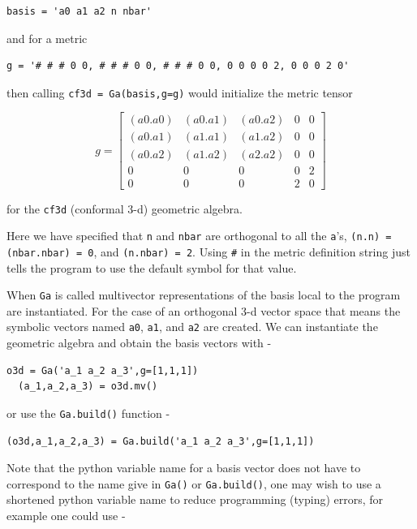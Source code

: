 \documentclass[12pt]{report}
\newcommand{\lbrk}{\left [}
\newcommand{\rbrk}{\right ]}
\newcommand{\T}[1]{\texttt{#1}}
\begin{document}
\begin{lstlisting}[numbers=none]
  basis = 'a0 a1 a2 n nbar'
\end{lstlisting}

and for a metric

\begin{lstlisting}[numbers=none]
  g = '# # # 0 0, # # # 0 0, # # # 0 0, 0 0 0 0 2, 0 0 0 2 0'
\end{lstlisting}

then calling \T{cf3d = Ga(basis,g=g)} would initialize the metric tensor

  \begin{equation}
  g = \lbrk
  \begin{array}{ccccc}
    (a0.a0) & (a0.a1)  & (a0.a2) & 0 & 0\\
    (a0.a1) & (a1.a1)  & (a1.a2) & 0 & 0\\
    (a0.a2) & (a1.a2)  & (a2.a2) & 0 & 0 \\
    0 & 0 & 0 & 0 & 2 \\
    0 & 0 & 0 & 2 & 0
  \end{array}
  \rbrk
  \end{equation}

for the  \T{cf3d} (conformal 3-d) geometric algebra.

Here we have specified that \T{n} and \T{nbar} are orthogonal to all the
\T{a}'s, \T{(n.n) = (nbar.nbar) = 0}, and \T{(n.nbar) = 2}. Using
\T{\#} in the metric definition string just tells the program to use the
default symbol for that value.

When \T{Ga} is called multivector representations of the basis local to
the program are instantiated.  For the case of an orthogonal 3-d vector
space that means the
symbolic vectors named \T{a0}, \T{a1}, and \T{a2} are created. We can
instantiate the geometric algebra and obtain the basis vectors with -

\begin{lstlisting}[numbers=none]
  o3d = Ga('a_1 a_2 a_3',g=[1,1,1])
  (a_1,a_2,a_3) = o3d.mv()
\end{lstlisting}

or use the \T{Ga.build()} function -

\begin{lstlisting}[numbers=none]
  (o3d,a_1,a_2,a_3) = Ga.build('a_1 a_2 a_3',g=[1,1,1])
\end{lstlisting}

Note that the python variable name for a basis vector does not have to
correspond to the name give in \T{Ga()} or \T{Ga.build()}, one may wish to use a
shortened python variable name to reduce programming (typing) errors, for
example one could use -
\end{document}
